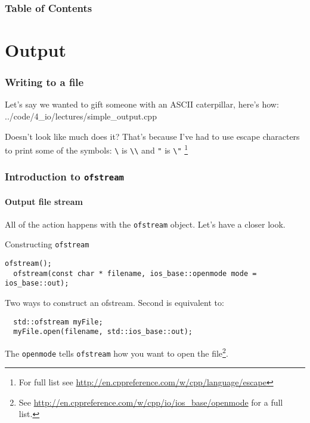 \documentclass{beamer}
\subtitle{Session 4: Input, output and text manipulation}
\begin{document}
\frame{\titlepage}

\begin{frame}
\frametitle{Table of Contents}
\tableofcontents
\end{frame}

\section{Output}

\begin{frame}[fragile]
  \frametitle{Writing to a file}
  
  Let's say we wanted to gift someone with an ASCII caterpillar, here's how:
  \pause
  	{../code/4_io/lectures/simple_output.cpp}

  \pause Doesn't look like much does it?  That's because I've had to use escape characters to print some of the symbols:
  	\texttt{\textbackslash} is \texttt{\textbackslash\textbackslash} and
  	\texttt{"}  is \texttt{\textbackslash"} \footnote{For full list see \url{http://en.cppreference.com/w/cpp/language/escape}}

\end{frame}

\begin{frame}[fragile]
  \frametitle{Introduction to  \texttt{ofstream}}
  \framesubtitle{\textbf{O}utput \textbf{f}ile \textbf{stream}}
  All of the action happens with the \texttt{ofstream} object.  Let's have a closer look.
  \pause
  \begin{block}{Constructing \texttt{ofstream}}
    \begin{lstlisting}[aboveskip=0pt]
  ofstream();
  ofstream(const char * filename, ios_base::openmode mode = ios_base::out);
    \end{lstlisting}
  Two ways to construct an ofstream.  Second is equivalent to:
    \begin{lstlisting}
  std::ofstream myFile;
  myFile.open(filename, std::ios_base::out);
    \end{lstlisting}
    The \texttt{openmode} tells \texttt{ofstream} how you want to open the file\footnote{See \url{http://en.cppreference.com/w/cpp/io/ios_base/openmode} for a full list.}.
  \end{block}

\end{frame}
\end{document}
